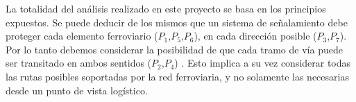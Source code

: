     La totalidad del análisis realizado en este proyecto se basa en los principios expuestos. Se puede deducir de los mismos que un sistema de señalamiento debe proteger cada elemento ferroviario ($P_1$,$P_5$,$P_6$), en cada dirección posible ($P_3$,$P_7$). Por lo tanto debemos considerar la posibilidad de que cada tramo de vía puede ser transitado en ambos sentidos ($P_2$,$P_4$) . Esto implica a su vez considerar todas las rutas posibles soportadas por la red ferroviaria, y no solamente las necesarias desde un punto de vista logístico.